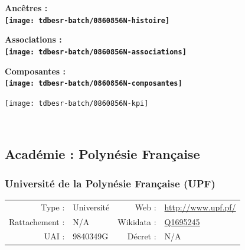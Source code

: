 \documentclass[12pt,french,]{article}
\begin{document}
\vspace{1cm}  
\begin{minipage}[b]{0.50\textwidth}\begin{center} \bf Ancêtres : \\  
\texttt{[image: tdbesr-batch/0860856N-histoire]} \end{center}\end{minipage}\begin{minipage}[b]{0.50\textwidth}\begin{center} \bf Associations : \\  
\texttt{[image: tdbesr-batch/0860856N-associations]} \end{center}\end{minipage}

\hrulefill

\begin{center} \bf Composantes : \\  
\texttt{[image: tdbesr-batch/0860856N-composantes]} \end{center}

\begin{center}\texttt{[image: tdbesr-batch/0860856N-kpi]} \end{center}\checkoddpage

\ifoddpage ~\newpage \fi   

\hypertarget{acaduxe9mie-polynuxe9sie-franuxe7aise}{%
\subsection{Académie : Polynésie
Française}\label{acaduxe9mie-polynuxe9sie-franuxe7aise}}

\hypertarget{universituxe9-de-la-polynuxe9sie-franuxe7aise-upf}{%
\subsubsection{Université de la Polynésie Française
(UPF)}\label{universituxe9-de-la-polynuxe9sie-franuxe7aise-upf}}

\begin{tabular*}{\textwidth}{rp{5cm}rl}  
\hline  
Type : & Université & Web : &\href{http://www.upf.pf/}{http://www.upf.pf/} \\  
Rattachement : & N/A & Wikidata : & \href{https://www.wikidata.org/entity/Q1695245}{Q1695245} \\  
UAI : & 9840349G & Décret : & N/A \\  
\hline  
\end{tabular*}
\end{document}
